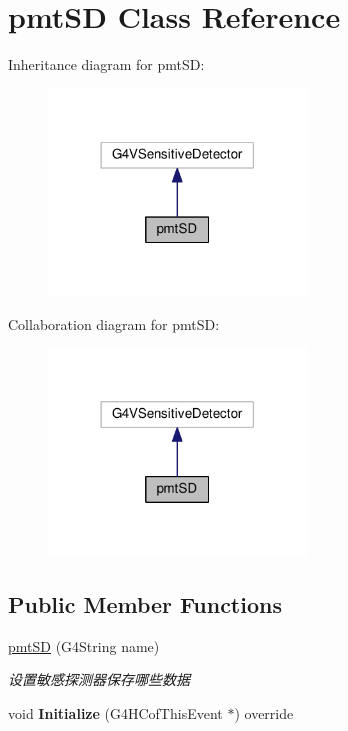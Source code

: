 \hypertarget{classpmtSD}{}\section{pmt\+SD Class Reference}
\label{classpmtSD}


Inheritance diagram for pmt\+SD\+:\nopagebreak
\begin{figure}[H]
\begin{center}
\leavevmode
\includegraphics[width=194pt]{classpmtSD__inherit__graph}
\end{center}
\end{figure}


Collaboration diagram for pmt\+SD\+:\nopagebreak
\begin{figure}[H]
\begin{center}
\leavevmode
\includegraphics[width=194pt]{classpmtSD__coll__graph}
\end{center}
\end{figure}
\subsection*{Public Member Functions}
\begin{DoxyCompactItemize}
\item 
\hyperlink{classpmtSD_ae7746efb08ea75673a718fd342d243ea}{pmt\+SD} (G4\+String name)
\begin{DoxyCompactList}\small\item\em 设置敏感探测器保存哪些数据 \end{DoxyCompactList}\item 
\mbox{\label{classpmtSD_a5241646bdc0f46e27b011bf4fa35dc07}} 
void {\bfseries Initialize} (G4\+H\+Cof\+This\+Event $\ast$) override
\end{DoxyCompactItemize}
